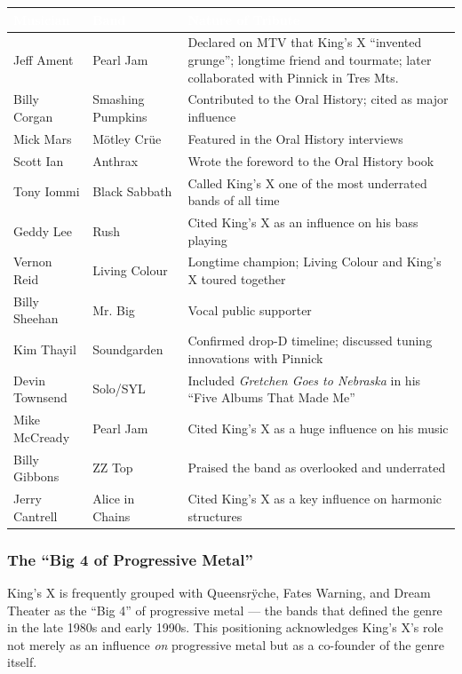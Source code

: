 \documentclass[11pt,letterpaper]{article}
\newcommand{\tableheader}[1]{\textbf{\sffamily\textcolor{white}{#1}}}
\begin{document}
\begin{center}
\begin{tabularx}{\textwidth}{L{3cm}L{2.5cm}X}
\toprule
{}
\tableheader{Musician} & \tableheader{Band} & \tableheader{Nature of Tribute} \\
\midrule
Jeff Ament & Pearl Jam & Declared on MTV that King's X ``invented grunge''; longtime friend and tourmate; later collaborated with Pinnick in Tres Mts. \\
Billy Corgan & Smashing Pumpkins & Contributed to the Oral History; cited as major influence \\
Mick Mars & M\"{o}tley Cr\"{u}e & Featured in the Oral History interviews \\
Scott Ian & Anthrax & Wrote the foreword to the Oral History book \\
Tony Iommi & Black Sabbath & Called King's X one of the most underrated bands of all time \\
Geddy Lee & Rush & Cited King's X as an influence on his bass playing \\
Vernon Reid & Living Colour & Longtime champion; Living Colour and King's X toured together \\
Billy Sheehan & Mr. Big & Vocal public supporter \\
Kim Thayil & Soundgarden & Confirmed drop-D timeline; discussed tuning innovations with Pinnick \\
Devin Townsend & Solo/SYL & Included \textit{Gretchen Goes to Nebraska} in his ``Five Albums That Made Me'' \\
Mike McCready & Pearl Jam & Cited King's X as a huge influence on his music \\
Billy Gibbons & ZZ Top & Praised the band as overlooked and underrated \\
Jerry Cantrell & Alice in Chains & Cited King's X as a key influence on harmonic structures \\
\bottomrule
\end{tabularx}
\end{center}

\subsubsection{The ``Big 4 of Progressive Metal''}

King's X is frequently grouped with Queensr\"{y}che, Fates Warning, and Dream Theater as the ``Big 4'' of progressive metal --- the bands that defined the genre in the late 1980s and early 1990s. This positioning acknowledges King's X's role not merely as an influence \textit{on} progressive metal but as a co-founder of the genre itself.
\end{document}
